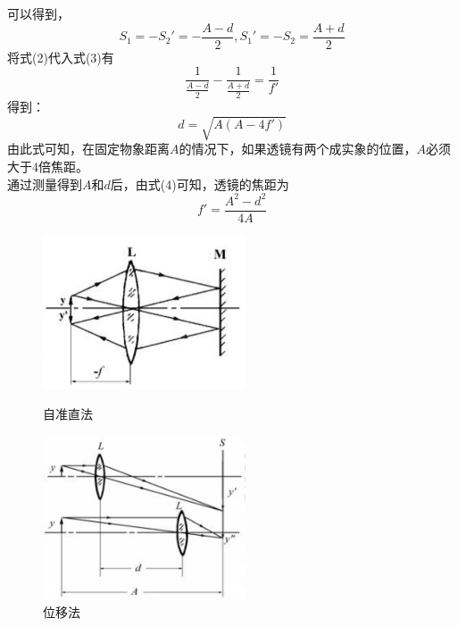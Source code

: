 \documentclass{article}
\begin{document}
可以得到，
\begin{equation}
    S_1=-S_2'=-\frac{A-d}{2},S_1'=-S_2=\frac{A+d}{2}
\end{equation}
将式(2)代入式(3)有
\begin{equation}
    \frac{1}{\frac{A-d}{2}}-\frac{1}{\frac{A+d}{2}}=\frac{1}{f'}
\end{equation}
得到：
\begin{equation}
    d=\sqrt{A(A-4f')}
\end{equation}
由此式可知，在固定物象距离\(A\)的情况下，如果透镜有两个成实象的位置，\(A\)必须大于\(4\)倍焦距。\\
\hspace*{2em}通过测量得到\(A\)和\(d\)后，由式(4)可知，透镜的焦距为
\begin{equation}
    f'=\frac{A^2-d^2}{4A}
\end{equation}
\begin{figure}[ht]
    \centering
    \begin{minipage}{0.45\textwidth} %
        \centering
        \includegraphics[width=6cm]{2.1.1.png} %
        \caption{自准直法}
    \end{minipage}\hfill
    \centering
    \begin{minipage}{0.45\textwidth} %
        \centering
        \includegraphics[width=6cm]{2.1.2.png} %
        \caption{位移法}
    \end{minipage}\hfill
\end{figure}
\end{document}
